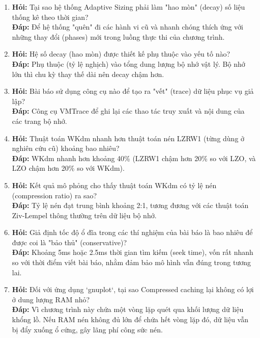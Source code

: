 \documentclass[12pt,a4paper]{article}
\begin{document}
\begin{enumerate}
    \item \textbf{Hỏi:} Tại sao hệ thống Adaptive Sizing phải làm "hao mòn" (decay) số liệu thống kê theo thời gian? \\
    \textbf{Đáp:} Để hệ thống "quên" đi các hành vi cũ và nhanh chóng thích ứng với những thay đổi (phases) mới trong luồng thực thi của chương trình.
    
    \item \textbf{Hỏi:} Hệ số decay (hao mòn) được thiết kế phụ thuộc vào yếu tố nào? \\
    \textbf{Đáp:} Phụ thuộc (tỷ lệ nghịch) vào tổng dung lượng bộ nhớ vật lý. Bộ nhớ lớn thì chu kỳ thay thế dài nên decay chậm hơn.
    
    \item \textbf{Hỏi:} Bài báo sử dụng công cụ nào để tạo ra "vết" (trace) dữ liệu phục vụ giả lập? \\
    \textbf{Đáp:} Công cụ VMTrace để ghi lại các thao tác truy xuất và nội dung của các trang bộ nhớ.
    
    \item \textbf{Hỏi:} Thuật toán WKdm nhanh hơn thuật toán nén LZRW1 (từng dùng ở nghiên cứu cũ) khoảng bao nhiêu? \\
    \textbf{Đáp:} WKdm nhanh hơn khoảng 40\% (LZRW1 chậm hơn 20\% so với LZO, và LZO chậm hơn 20\% so với WKdm).
    
    \item \textbf{Hỏi:} Kết quả mô phỏng cho thấy thuật toán WKdm có tỷ lệ nén (compression ratio) ra sao? \\
    \textbf{Đáp:} Tỷ lệ nén đạt trung bình khoảng 2:1, tương đương với các thuật toán Ziv-Lempel thông thường trên dữ liệu bộ nhớ.
    
    \item \textbf{Hỏi:} Giả định tốc độ ổ đĩa trong các thí nghiệm của bài báo là bao nhiêu để được coi là "bảo thủ" (conservative)? \\
    \textbf{Đáp:} Khoảng 5ms hoặc 2.5ms thời gian tìm kiếm (seek time), vốn rất nhanh so với thời điểm viết bài báo, nhằm đảm bảo mô hình vẫn đúng trong tương lai.
    
    \item \textbf{Hỏi:} Đối với ứng dụng `gnuplot`, tại sao Compressed caching lại không có lợi ở dung lượng RAM nhỏ? \\
    \textbf{Đáp:} Vì chương trình này chứa một vòng lặp quét qua khối lượng dữ liệu khổng lồ. Nếu RAM nén không đủ lớn để chứa hết vòng lặp đó, dữ liệu vẫn bị đẩy xuống ổ cứng, gây lãng phí công sức nén.
    

\end{enumerate}
\end{document}
